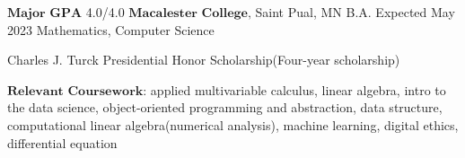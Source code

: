 

\begin{cventries}

  \cventry
    {$\textbf{Major GPA }$4.0/4.0} %
    {$\textbf{Macalester College,}$ Saint Pual, MN} %
    {B.A. Expected May 2023} %
    {Mathematics, Computer Science} %
    {   
      \begin{cvitems} %
        \item {Charles J. Turck Presidential Honor Scholarship(Four-year scholarship)}
        \item {$\textbf{Relevant Coursework}$: applied multivariable calculus, linear algebra, intro to the data science, object-oriented programming and abstraction, data structure, computational linear algebra(numerical analysis), machine learning, digital ethics, differential equation}
      \end{cvitems}
    }

\end{cventries}
